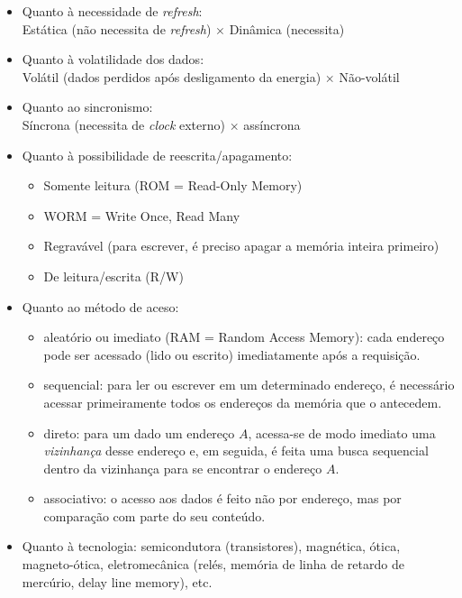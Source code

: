 \documentclass[a4paper,12pt,notitlepage]{article}
\begin{document}
\begin{itemize}
\item Quanto à necessidade de \emph{refresh}:\\
      Estática (não necessita de \emph{refresh}) $\times$ Dinâmica (necessita)

\item Quanto à volatilidade dos dados:\\
      Volátil (dados perdidos após desligamento da energia) $\times$ Não-volátil

\item Quanto ao sincronismo:\\
      Síncrona (necessita de \emph{clock} externo) $\times$ assíncrona

\item Quanto à possibilidade de reescrita/apagamento:
\begin{itemize}
  \item Somente leitura (ROM = Read-Only Memory)
  \item WORM = Write Once, Read Many
  \item Regravável (para escrever, é preciso apagar a memória inteira primeiro)
  \item De leitura/escrita (R/W)
\end{itemize}

\item Quanto ao método de aceso:
\begin{itemize}
  \item aleatório ou imediato (RAM = Random Access Memory):
        cada endereço pode ser acessado (lido ou escrito) imediatamente
        após a requisição.
  \item sequencial: para ler ou escrever em um determinado endereço, é
        necessário acessar primeiramente todos os endereços da memória que
        o antecedem.
  \item direto: para um dado um endereço $A$, acessa-se de modo
        imediato uma \emph{vizinhança} desse endereço e, em seguida, é
        feita uma busca sequencial dentro da vizinhança para se encontrar
        o endereço $A$.
  \item associativo: o acesso aos dados é feito não por endereço, mas
        por comparação com parte do seu conteúdo.
\end{itemize}

\item Quanto à tecnologia: semicondutora (transistores), magnética, ótica,
      magneto-ótica, eletromecânica (relés, memória de linha de retardo de
      mercúrio, delay line memory), etc.
\end{itemize}
\end{document}
